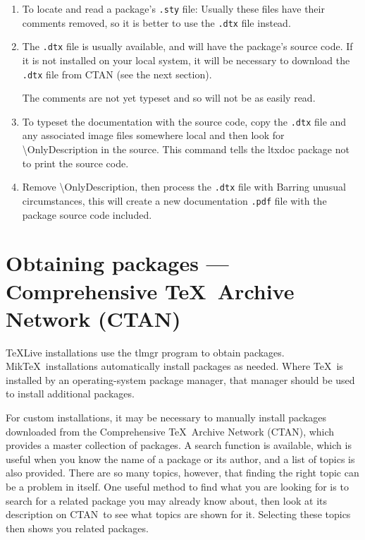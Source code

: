 \documentclass{article}
\DeclareRobustCommand{\cs}[1]{{\tt \char`\\#1}}
\def\CTAN{\acro{CTAN}}
\newcommand{\acro}[1]{\textsc{\MakeLowercase{#1}}}
\def\quad{ }%
\def\\{ }%
\def\pkg#1{#1}%
\def\cs#1{\textbackslash#1}%
\def\TeX{TeX}%
\def\Dash{ --- }%
\def\prog#1{\detokenize{#1}}%
\def\acro#1{#1}%
\renewcommand*{\quad}{ }
\renewcommand*{\pkg}[1]{#1}
\renewcommand*{\prog}[1]{#1}
\renewcommand*{\TeX}{TeX}
\renewcommand*{\Dash}{ --- }
\begin{document}
\begin{enumerate}
\item To locate and read a package's \verb+.sty+ file:
Usually these files have their comments removed,
so it is better to use the \verb+.dtx+ file instead.
\item The \verb+.dtx+ file is usually available,
and will have the package's source code.
If it is not installed on your local system, it will
be necessary to download the \verb+.dtx+ file from
CTAN (see the next section).

The comments are not yet typeset and so
will not be as easily read.
\item To typeset the documentation with the source code,
copy the \verb+.dtx+ file and any associated image files
somewhere local and then look for
\cs{OnlyDescription}
in the source.
This command tells the \pkg{ltxdoc} package not to print the source code.
\item Remove \cs{OnlyDescription}, then process the \verb+.dtx+ file with
Barring unusual circumstances, this will create a new documentation
\verb+.pdf+ file with the package source code included.
\end{enumerate}



\section{%
    Obtaining packages \Dash Comprehensive \TeX\ Archive Network \protect\quad (CTAN)%
}

\TeX{}Live installations use the \prog{tlmgr} program to obtain packages.
Mik\TeX\ installations automatically install packages as needed.
Where \TeX\ is installed by an operating-system package manager, that manager should
be used to install additional packages.

For custom installations, it may be necessary to manually install packages
downloaded from the Comprehensive \TeX\ Archive Network
(\CTAN), which provides a master collection of
packages.  A search function is available, which is useful when you know the
name of a package or its author, and a list of topics is also provided.
There are so many topics, however, that finding the right topic can be a
problem in itself.  One useful method to find what you are looking for is
to search for a related package you may already know about, then look at
its description on \CTAN\ to see what topics are shown for it.  Selecting these
topics then shows you related packages.
\end{document}
